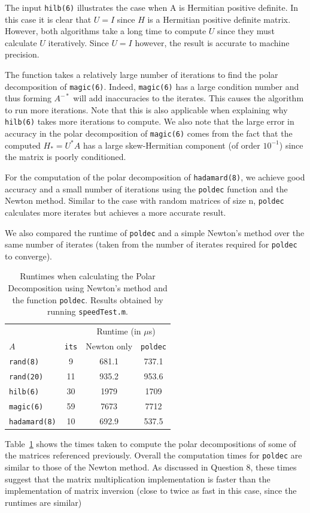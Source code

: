 \documentclass[10pt, A4paper]{article}
\begin{document}
The input \texttt{hilb(6)} illustrates the case when A is 
Hermitian positive definite.
In this case it is clear that $U = I$ since $H$ is a Hermitian positive 
definite matrix.
However, both algorithms take a long time to compute $U$ since they 
must calculate $U$ iteratively. Since $U = I$ however, the 
result is accurate to machine precision.

The function takes a relatively large number of iterations to find the 
polar decomposition of \texttt{magic(6)}.
Indeed, \texttt{magic(6)} has a large condition number and thus forming 
$A^{-*}$ will add inaccuracies to the iterates. 
This causes the algorithm to run more iterations.
Note that this is also applicable when explaining why \texttt{hilb(6)} 
takes more iterations to compute.
We also note that the large error in accuracy in the polar 
decomposition of \texttt{magic(6)} comes from the fact that the 
computed $H_* = U^*A$ has a large skew-Hermitian component (of order 
$10^{-1}$) since the matrix is poorly conditioned.

For the computation of the polar decomposition of \texttt{hadamard(8)}, 
we achieve good accuracy and a small number of iterations using the 
\texttt{poldec} function and the Newton method.
Similar to the case with random matrices of size n, \texttt{poldec} 
calculates more iterates but achieves a more accurate result.

We also compared the runtime of \texttt{poldec} and a simple Newton's 
method over the same number of iterates (taken from the number of 
iterates required for \texttt{poldec} to converge).
\begin{table}[t]
	\centering
	\begin{tabular}{ l c c c }
		\toprule
		& &\multicolumn{2}{c}{Runtime (in $\mu$s)} \\
		\cmidrule(lr){3-4}
		$A$ & \texttt{its} & Newton only & \texttt{poldec} \\
		\midrule
		\texttt{rand(8)}     & 9  & 681.1 & 737.1  \\
		\texttt{rand(20)}    & 11 & 935.2 & 953.6  \\
		\texttt{hilb(6)}     & 30 & 1979  & 1709   \\
		\texttt{magic(6)}    & 59 & 7673  & 7712   \\
		\texttt{hadamard(8)} & 10 & 692.9 & 537.5  \\
		\bottomrule
	\end{tabular}
	\caption{
	Runtimes when calculating the Polar Decomposition using 
	Newton's method and the function \texttt{poldec}. Results obtained 
	by running \texttt{speedTest.m}.
	\label{tab:runtimes}}
\end{table}
Table~\ref{tab:runtimes} shows the times taken to compute the polar 
decompositions of some of the matrices referenced previously.
Overall the computation times for \texttt{poldec} are similar to those 
of the Newton method.
As discussed in Question 8, these times suggest that the matrix 
multiplication implementation is faster than the implementation of 
matrix inversion (close to twice as fast in this case, since the 
runtimes are similar)
\end{document}
